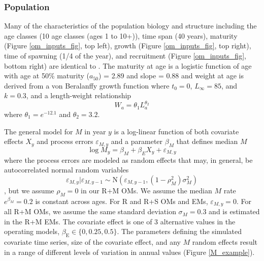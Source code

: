 \documentclass[
  12pt,
]{article}
\begin{document}
\hypertarget{population}{%
\subsubsection*{Population}\label{population}}

Many of the characteristics of the population biology and structure including the age classes (10 age classes (ages 1 to 10+)), time span (40 years), maturity (Figure \ref{om_inputs_fig}, top left), growth (Figure \ref{om_inputs_fig}, top right), time of spawning (1/4 of the year), and recruitment (Figure \ref{om_inputs_fig}, bottom right) are identical to \citet{milleretal_inreview1}. The maturity at age is a logistic function of age with age at 50\% maturity (\(a_{50}\)) = 2.89 and slope = 0.88 and weight at age is derived from a von Beralanffy growth function where \(t_0 = 0\), \(L_\infty = 85\), and \(k = 0.3\), and a length-weight relationship
\[
W_a = \theta_1 L_a^{\theta_2}
\]
where \(\theta_1 = e^{-12.1}\) and \(\theta_2 = 3.2\).

The general model for \(M\) in year \(y\) is a log-linear function of both covariate effects \(X_y\) and process errors \(\varepsilon_{M,y}\) and a parameter \(\beta_{M}\) that defines median \(M\)
\[
\log M_y = \beta_M + \beta_{E} X_y + \varepsilon_{M,y}
\]
where the process errors are modeled as random effects that may, in general, be autocorrelated normal random variables
\[
\varepsilon_{M,y}|\varepsilon_{M,y-1} \sim \text{N}\left(\varepsilon_{M,y-1},(1-\rho_M^2)\sigma_M^2\right)
\]
\citep{stockmiller21}, but we assume \(\rho_M = 0\) in our R+M OMs. We assume the median \(M\) rate \(e^{\beta_M} = 0.2\) is constant across ages. For R and R+S OMs and EMs, \(\varepsilon_{M,y} = 0\). For all R+M OMs, we assume the same standard deviation \(\sigma_M = 0.3\) and is estimated in the R+M EMs. The covariate effect is one of 3 alternative values in the operating models, \(\beta_\text{E} \in \{0,0.25,0.5\}\). The parameters defining the simulated covariate time series, size of the covariate effect, and any \(M\) random effects result in a range of different levels of variation in annual values (Figure \ref{M_example}).
\end{document}
